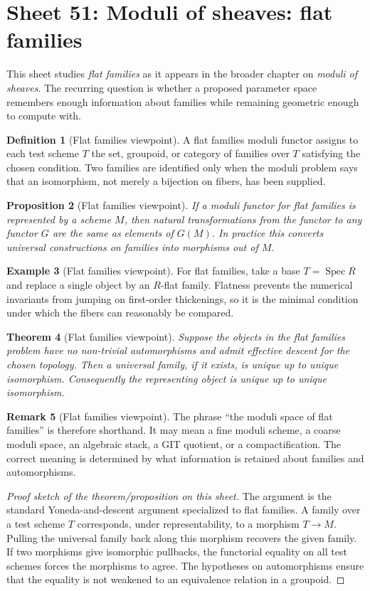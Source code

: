 \documentclass[11pt]{amsart}
\newtheorem{theorem}{Theorem}[section]
\newtheorem{proposition}[theorem]{Proposition}
\theoremstyle{definition}
\newtheorem{definition}[theorem]{Definition}
\newtheorem{example}[theorem]{Example}
\newtheorem{remark}[theorem]{Remark}
\newcommand{\Spec}{\operatorname{Spec}}
\begin{document}
\section{Sheet 51: Moduli of sheaves: flat families}
This sheet studies \emph{flat families} as it appears in the broader chapter on \emph{moduli of sheaves}.  The recurring question is whether a proposed parameter space remembers enough information about families while remaining geometric enough to compute with.
\begin{definition}[Flat families viewpoint]
A flat families moduli functor assigns to each test scheme $T$ the set, groupoid, or category of families over $T$ satisfying the chosen condition.  Two families are identified only when the moduli problem says that an isomorphism, not merely a bijection on fibers, has been supplied.
\end{definition}
\begin{proposition}[Flat families viewpoint]
If a moduli functor for flat families is represented by a scheme $M$, then natural transformations from the functor to any functor $G$ are the same as elements of $G(M)$.  In practice this converts universal constructions on families into morphisms out of $M$.
\end{proposition}
\begin{example}[Flat families viewpoint]
For flat families, take a base $T=\Spec R$ and replace a single object by an $R$-flat family.  Flatness prevents the numerical invariants from jumping on first-order thickenings, so it is the minimal condition under which the fibers can reasonably be compared.
\end{example}
\begin{theorem}[Flat families viewpoint]
Suppose the objects in the flat families problem have no non-trivial automorphisms and admit effective descent for the chosen topology.  Then a universal family, if it exists, is unique up to unique isomorphism.  Consequently the representing object is unique up to unique isomorphism.
\end{theorem}
\begin{remark}[Flat families viewpoint]
The phrase ``the moduli space of flat families'' is therefore shorthand.  It may mean a fine moduli scheme, a coarse moduli space, an algebraic stack, a GIT quotient, or a compactification.  The correct meaning is determined by what information is retained about families and automorphisms.
\end{remark}
\begin{proof}[Proof sketch of the theorem/proposition on this sheet]
The argument is the standard Yoneda-and-descent argument specialized to flat families.  A family over a test scheme $T$ corresponds, under representability, to a morphism $T\to M$.  Pulling the universal family back along this morphism recovers the given family.  If two morphisms give isomorphic pullbacks, the functorial equality on all test schemes forces the morphisms to agree.  The hypotheses on automorphisms ensure that the equality is not weakened to an equivalence relation in a groupoid.
\end{proof}
\end{document}
